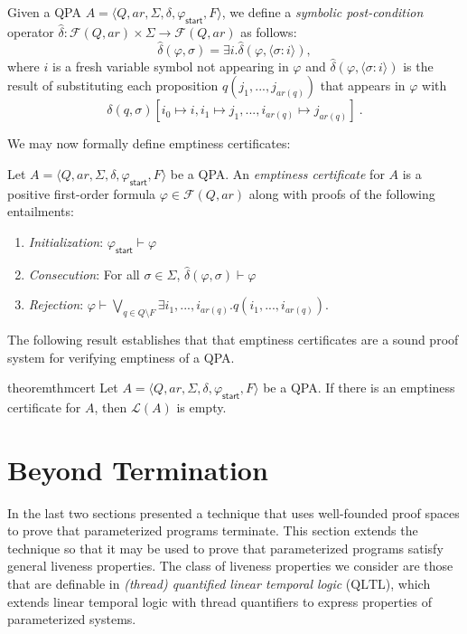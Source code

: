\documentclass[9pt,nocopyrightspace]{sigplanconf}
\theoremstyle{definition}
\newcommand{\tuple}[1]{\langle #1 \rangle}
\newcommand{\ic}[2]{{\tuple{#1 : #2}}}
\newcommand{\lang}{\mathcal{L}}
\newcommand{\start}{\mathsf{start}}
\renewcommand{\phi}{\varphi}
\newcommand{\formulae}{\mathcal{F}}
\newcommand{\ar}{\textit{ar}}
\newcommand{\QLTL}{\text{QLTL}}
\begin{document}
Given a QPA $A = \tuple{Q,\ar,\Sigma,\delta,\phi_\start,F}$, we
define a \emph{symbolic post-condition} operator $\hat{\delta} :
\formulae(Q,\ar) \times \Sigma \rightarrow \formulae(Q,\ar)$ as follows:
\[\hat{\delta}(\phi, \sigma) = \exists i. \hat{\delta}(\phi, \ic{\sigma}{i}),\]
where $i$ is a fresh variable symbol not appearing in $\phi$ and
$\hat{\delta}(\phi, \ic{\sigma}{i})$ is the result of substituting each
proposition $q(j_1,...,j_{\ar(q)})$ that appears in $\phi$
with \[\delta(q,\sigma)[i_0 \mapsto i,i_1 \mapsto j_1, ..., i_{\ar(q)} \mapsto
  j_{\ar(q)}]\ .\]

We may now formally define emptiness certificates:
\begin{definition} \label{def:emp_cert}
  Let $A = \tuple{Q,\ar,\Sigma,\delta,\phi_\start,F}$ be a QPA.  An
  \emph{emptiness certificate} for $A$ is a positive first-order formula $\phi
  \in \formulae(Q,\ar)$ along with proofs of the following entailments:
  \begin{enumerate}
  \item \emph{Initialization}: $\phi_\start \vdash \phi$
  \item \emph{Consecution}: For all $\sigma \in \Sigma$, $\hat{\delta}(\phi,\sigma) \vdash \phi$
  \item \emph{Rejection}: $\phi \vdash \bigvee_{q \in Q\setminus F} \exists i_1,...,i_{\ar(q)}. q(i_1,...,i_{\ar(q)})$. \qedhere
  \end{enumerate}
\end{definition}





The following result establishes that that emptiness certificates are a sound
proof system for verifying emptiness of a QPA.
\begin{restatable}{theorem}{thmcert}
  \label{thm:cert}
    Let $A = \tuple{Q,\ar,\Sigma,\delta,\phi_\start,F}$ be a QPA.  If there is
    an emptiness certificate for $A$, then $\lang(A)$ is empty.
\end{restatable}


\section{Beyond Termination} \label{sec:liveness}
In the last two sections presented a technique that uses well-founded proof
spaces to prove that parameterized programs terminate.  This section extends
the technique so that it may be used to prove that parameterized programs
satisfy general liveness properties.  The class of liveness properties we
consider are those that are definable in \emph{(thread) quantified linear
  temporal logic} ($\QLTL$), which extends linear temporal logic with thread
quantifiers to express properties of parameterized systems.
\end{document}
